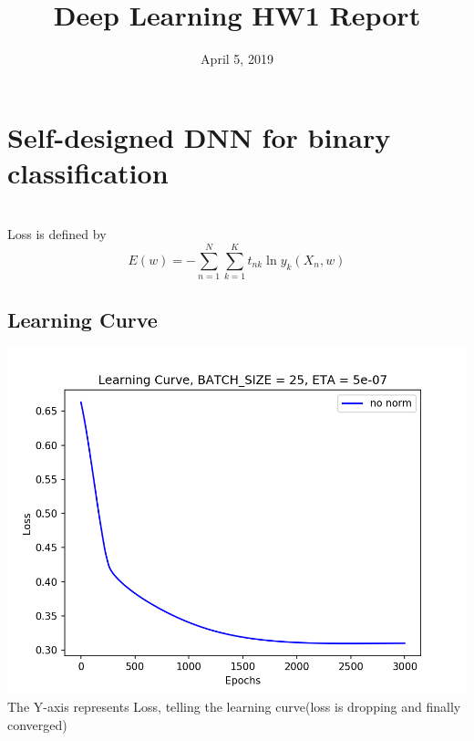 \documentclass[11pt, a4paper]{article} %
\title{Deep Learning HW1 Report} %
\begin{document}


\date{April 5, 2019}

\maketitle{} %

\setcounter{page}{1} %

\section{Self-designed DNN for binary classification} %
\\ Loss is defined by $${E(w) = -\sum_{n = 1}^N\sum_{k = 1}^K t_{nk}\ln y_k(X_n, w)}$$
\subsection{Learning Curve} %
\includegraphics[scale = 1.0]{figure/LC_3.png}
\\ The Y-axis represents Loss, telling the learning curve(loss is dropping and finally converged)
\end{document}

